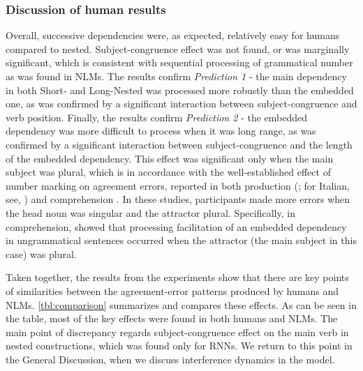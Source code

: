 \subsubsection{Discussion of human results}
Overall, successive dependencies were, as expected, relatively easy for humans compared to nested. Subject-congruence effect was not found, or was marginally significant, which is consistent with sequential processing of grammatical number as was found in NLMs. The results confirm \textit{Prediction 1} - the main dependency in both Short- and Long-Nested was processed more robustly than the embedded one, as was confirmed by a significant interaction between subject-congruence and verb position. Finally, the results confirm \textit{Prediction 2} - the embedded dependency was more difficult to process when it was long range, as was confirmed by a significant interaction between subject-congruence and the length of the embedded dependency. This effect was significant only when the main subject was plural, which is in accordance with the well-established effect of number marking on agreement errors, reported in both production (\citet{Bock:Miller:1991, bock1993meaning, eberhard1997marked}; for Italian, see, \citet{vigliocco1995constructing}) and comprehension \citep[e.g.,][]{pearlmutter1999agreement, wagers2009agreement, lago2015agreement}. In these studies, participants made more errors when the head noun was singular and the attractor plural. Specifically, in comprehension, \citet{wagers2009agreement} showed that processing facilitation of an embedded dependency in ungrammatical sentences occurred when the attractor (the main subject in this case) was plural.

\vspace{10pt}
Taken together, the results from the experiments show that there are key points of similarities between the agreement-error patterns produced by humans and NLMs. \ref{tbl:comparison} summarizes and compares these effects. As can be seen in the table, most of the key effects were found in both humans and NLMs. The main point of discrepancy regards subject-congruence effect on the main verb in nested constructions, which was found only for RNNs. We return to this point in the General Discussion, when we discuss interference dynamics in the model.




